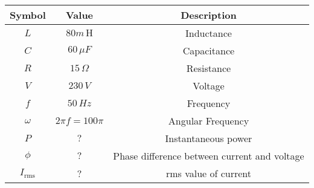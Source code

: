 \begin{tabular}{|c|c|c|}
	\hline
	\textbf{Symbol} & \textbf{Value} &
	\textbf{Description}\\[6pt]
	\hline
	$L$ &  $80m\,
	\text{H}$ & Inductance\\[6pt]
	\hline 
	$C$ &  $60\, \mu F$ & Capacitance \\[6pt]
	\hline
	$R$ &  $15\, \Omega$ & Resistance\\[6pt]
	\hline
	$V$ & $230\, V$ & Voltage\\[6pt]
	\hline
	$f$ & $50\, {Hz}$ & Frequency\\[6pt]
	\hline
	$\omega$ & $2\pi f=100\pi$ & Angular Frequency\\[6pt]
	\hline
	$P$ & $?$ & Instantaneous power\\[6pt]
	\hline
	$\phi$ & $?$ & Phase difference between current and voltage\\[6pt]
	\hline
	$I_ \text{rms}$ & ? & rms value of current\\
	\hline
\end{tabular}